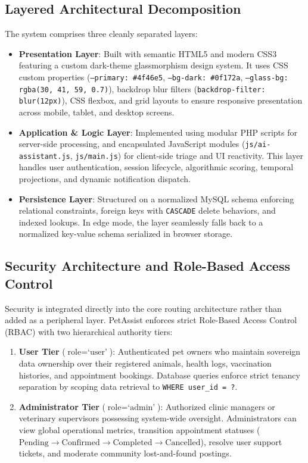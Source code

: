 \documentclass[conference]{IEEEtran}
\begin{document}
\subsection{Layered Architectural Decomposition}
The system comprises three cleanly separated layers:
\begin{itemize}
    \item \textbf{Presentation Layer}: Built with semantic HTML5 and modern CSS3 featuring a custom dark-theme glassmorphism design system. It uses CSS custom properties (\texttt{--primary: \#4f46e5}, \texttt{--bg-dark: \#0f172a}, \texttt{--glass-bg: rgba(30, 41, 59, 0.7)}), backdrop blur filters (\texttt{backdrop-filter: blur(12px)}), CSS flexbox, and grid layouts to ensure responsive presentation across mobile, tablet, and desktop screens.
    \item \textbf{Application \& Logic Layer}: Implemented using modular PHP scripts for server-side processing, and encapsulated JavaScript modules (\texttt{js/ai-assistant.js}, \texttt{js/main.js}) for client-side triage and UI reactivity. This layer handles user authentication, session lifecycle, algorithmic scoring, temporal projections, and dynamic notification dispatch.
    \item \textbf{Persistence Layer}: Structured on a normalized MySQL schema enforcing relational constraints, foreign keys with \texttt{CASCADE} delete behaviors, and indexed lookups. In edge mode, the layer seamlessly falls back to a normalized key-value schema serialized in browser storage.
\end{itemize}

\subsection{Security Architecture and Role-Based Access Control}
Security is integrated directly into the core routing architecture rather than added as a peripheral layer. PetAssist enforces strict Role-Based Access Control (RBAC) with two hierarchical authority tiers:
\begin{enumerate}
    \item \textbf{User Tier} ($\text{role} = \text{`user'}$): Authenticated pet owners who maintain sovereign data ownership over their registered animals, health logs, vaccination histories, and appointment bookings. Database queries enforce strict tenancy separation by scoping data retrieval to \texttt{WHERE user\_id = ?}.
    \item \textbf{Administrator Tier} ($\text{role} = \text{`admin'}$): Authorized clinic managers or veterinary supervisors possessing system-wide oversight. Administrators can view global operational metrics, transition appointment statuses ($\text{Pending} \to \text{Confirmed} \to \text{Completed} \to \text{Cancelled}$), resolve user support tickets, and moderate community lost-and-found postings.
\end{enumerate}
\end{document}

